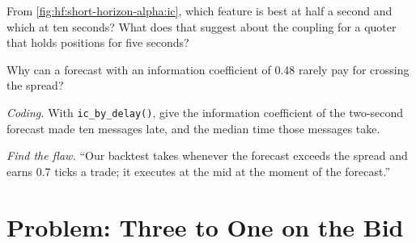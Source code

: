 \begin{exercise}[$\star\star$]\label{exo:hf:short-horizon-alpha:5}
From \cref{fig:hf:short-horizon-alpha:ic}, which feature is best at half a second and which at ten seconds? What does that suggest about the
coupling for a quoter that holds positions for five seconds?
\end{exercise}

\begin{exercise}[$\star\star$]\label{exo:hf:short-horizon-alpha:6}
Why can a forecast with an information coefficient of 0.48 rarely pay for crossing the spread?
\end{exercise}

\begin{exercise}[$\star\star\star$]\label{exo:hf:short-horizon-alpha:7}
\emph{Coding.} With \texttt{ic\_by\_delay()}, give the information coefficient of the two-second forecast made ten messages late, and the median time
those messages take.
\end{exercise}

\begin{exercise}[$\star\star\star$]\label{exo:hf:short-horizon-alpha:8}
\emph{Find the flaw.} ``Our backtest takes whenever the forecast exceeds the spread and earns 0.7 ticks a trade; it executes at the mid at the
moment of the forecast.''
\end{exercise}

\section{Problem: Three to One on the Bid}

